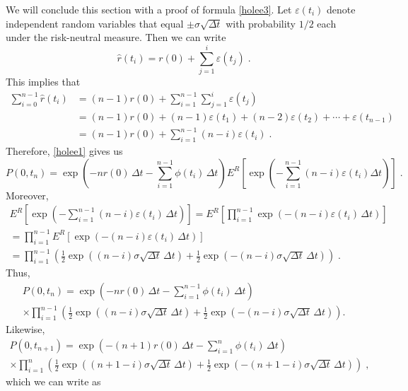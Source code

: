\begin{petit} We will conclude this section with a proof of formula \eqref{holee3}.  Let $\varepsilon(t_i)$ denote independent  random variables that equal $\pm \sigma \sqrt{\varDelta t}$ with probability $1/2$ each under the risk-neutral measure.  Then we can write
$$\hat{r}(t_i) = r(0) + \sum_{j=1}^i \varepsilon(t_j)\; .$$
This implies that
\begin{align*}
\sum_{i=0}^{n-1}\hat{r}(t_i)  
&= (n-1)r(0) + \sum_{i=1}^{n-1}\sum_{j=1}^i \varepsilon(t_j)\\
&= (n-1)r(0) + (n-1)\varepsilon(t_1) + (n-2)\varepsilon(t_2) + \cdots + \varepsilon(t_{n-1})\\
&= (n-1)r(0) + \sum_{i=1}^{n-1} (n-i)\varepsilon(t_i)\;.
\end{align*}
Therefore, \eqref{holee1} gives us
$$
P(0,t_n) = \exp\left(-nr(0)\,\varDelta t-\sum_{i=1}^{n-1}\phi(t_i)\,\varDelta t \right)E^R\left[\exp\left(-\sum_{i=1}^{n-1} (n-i)\varepsilon(t_i)\varDelta t\right)\right]\;.
$$
Moreover, 
\begin{multline*}
E^R\left[\exp\left(-\sum_{i=1}^{n-1}(n-i)\varepsilon(t_i)\,\varDelta t\right)\right]  = E^R \left[ \prod_{i=1}^{n-1}\exp\left(-(n-i)\varepsilon(t_i)\,\varDelta t\right)\right]\\
= \prod_{i=1}^{n-1} E^R \left[ \exp\left(-(n-i)\varepsilon(t_i)\,\varDelta t\right)\right]\\
= \prod_{i=1}^{n-1} \left( \frac{1}{2} \exp\left((n-i)\sigma\sqrt{\varDelta t}\,\varDelta t\right) + \frac{1}{2} \exp\left(-(n-i)\sigma\sqrt{\varDelta t}\,\varDelta t\right)\right)\;.
\end{multline*}
Thus,
\begin{multline*}
P(0,t_n) = \exp\left(-nr(0)\,\varDelta t-\sum_{i=1}^{n-1}\phi(t_i)\,\varDelta t\right) \\
\times \prod_{i=1}^{n-1} \left( \frac{1}{2} \exp\left((n-i)\sigma\sqrt{\varDelta t}\,\varDelta t\right) + \frac{1}{2} \exp\left(-(n-i)\sigma\sqrt{\varDelta t}\,\varDelta t\right)\right).
\end{multline*}
Likewise,
\begin{multline*}
P(0,t_{n+1})  = \exp\left(-(n+1)r(0)\,\varDelta t-\sum_{i=1}^n\phi(t_i)\,\varDelta t\right)\\
\times \prod_{i=1}^n \left( \frac{1}{2} \exp\left((n+1-i)\sigma\sqrt{\varDelta t}\,\varDelta t\right) + \frac{1}{2} \exp\left(-(n+1-i)\sigma\sqrt{\varDelta t}\,\varDelta t\right)\right)\; ,
\end{multline*}
which we can write as

\end{petit}
